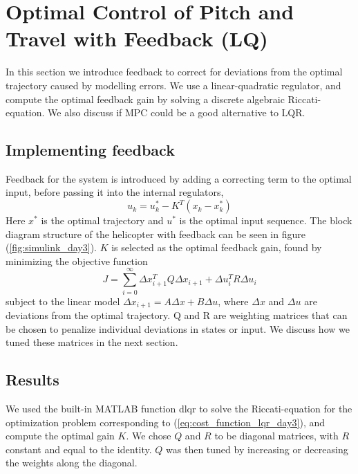\section{Optimal Control of Pitch and Travel with Feedback (LQ)}\label{sec:prob3}
In this section we introduce feedback to correct for deviations from the optimal trajectory caused by modelling errors. We use a linear-quadratic regulator, and compute the optimal feedback gain by solving a discrete algebraic Riccati-equation. We also discuss if MPC could be a good alternative to LQR.

\subsection{Implementing feedback}
Feedback for the system is introduced by adding a correcting term to the optimal input, before passing it into the internal regulators,
\begin{equation}
    u_k = u_k^* - K^T(x_k - x_k^*)
\end{equation}
Here $x^*$ is the optimal trajectory and $u^*$ is the optimal input sequence. The block diagram structure of the helicopter with feedback can be seen in figure (\ref{fig:simulink_day3}). $K$ is selected as the optimal feedback gain, found by minimizing the objective function
\begin{equation}
    \label{eq:cost_function_lqr_day3}
    J = \sum_{i=0}^\infty {\Delta x_{i+1}^TQ\Delta x_{i+1} + \Delta u_{i}^TR\Delta u_{i}}
\end{equation}
subject to the linear model $\Delta x_{i+1} = A\Delta x + B\Delta u$, where $\Delta x$ and $\Delta u$ are deviations from the optimal trajectory. Q and R are weighting matrices that can be chosen to penalize individual deviations in states or input. We discuss how we tuned these matrices in the next section.

\subsection{Results}
We used the built-in MATLAB function dlqr to solve the Riccati-equation for the optimization problem corresponding to (\ref{eq:cost_function_lqr_day3}), and compute the optimal gain $K$. We chose $Q$ and $R$ to be diagonal matrices, with $R$ constant and equal to the identity. $Q$ was then tuned by increasing or decreasing the weights along the diagonal.

